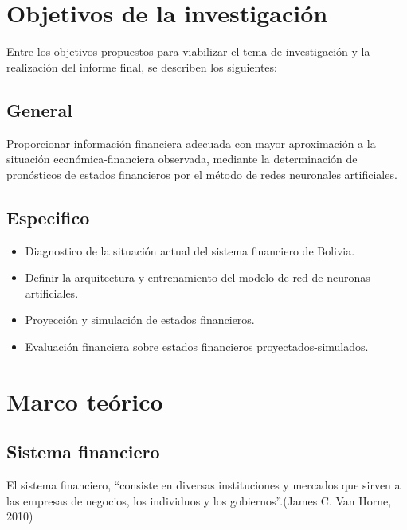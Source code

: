 \documentclass[
  12pt,
]{article}
\providecommand{\tightlist}{%
  \setlength{\itemsep}{0pt}\setlength{\parskip}{0pt}}
\begin{document}
\hypertarget{objetivos-de-la-investigaciuxf3n}{%
\section{Objetivos de la
investigación}\label{objetivos-de-la-investigaciuxf3n}}

Entre los objetivos propuestos para viabilizar el tema de investigación
y la realización del informe final, se describen los siguientes:

\hypertarget{general}{%
\subsection{General}\label{general}}

Proporcionar información financiera adecuada con mayor aproximación a la
situación económica-financiera observada, mediante la determinación de
pronósticos de estados financieros por el método de redes neuronales
artificiales.

\hypertarget{especifico}{%
\subsection{Especifico}\label{especifico}}

\begin{itemize}
\tightlist
\item
  Diagnostico de la situación actual del sistema financiero de Bolivia.
\item
  Definir la arquitectura y entrenamiento del modelo de red de neuronas
  artificiales.
\item
  Proyección y simulación de estados financieros.
\item
  Evaluación financiera sobre estados financieros proyectados-simulados.
\end{itemize}

\hypertarget{marco-teuxf3rico}{%
\section{Marco teórico}\label{marco-teuxf3rico}}

\hypertarget{sistema-financiero}{%
\subsection{Sistema financiero}\label{sistema-financiero}}

El sistema financiero, ``consiste en diversas instituciones y mercados
que sirven a las empresas de negocios, los individuos y los
gobiernos''.(James C. Van Horne, 2010)
\end{document}
